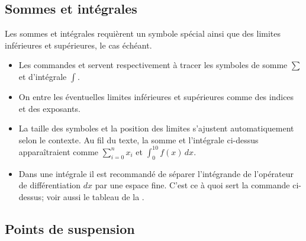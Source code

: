 \subsection{Sommes et intégrales}
\label{sec:math:bases:sommes-et-integrales}

Les sommes et intégrales requièrent un symbole spécial ainsi que des
limites inférieures et supérieures, le cas échéant.
\begin{itemize}
\item Les commandes \cmd{\sum} et \cmd{\int} servent respectivement à tracer les
  symboles de somme $\sum$ et d'intégrale $\int$.
\item On entre les éventuelles limites inférieures et supérieures
  comme des indices et des exposants.
\item La taille des symboles et la position des limites s'ajustent
  automatiquement selon le contexte. Au fil du texte, la somme et
  l'intégrale ci-dessus apparaîtraient comme $\sum_{i = 0}^n x_i$ et
  $\int_0^{10} f(x)\, dx$.
\item Dans une intégrale il est recommandé de séparer l'intégrande de
  l'opérateur de différentiation $dx$ par une espace fine. C'est ce à
  quoi sert la commande \cmd{\,} ci-dessus; voir aussi le tableau de
  la .
\end{itemize}

\subsection{Points de suspension}
\label{sec:math:bases:dots}

